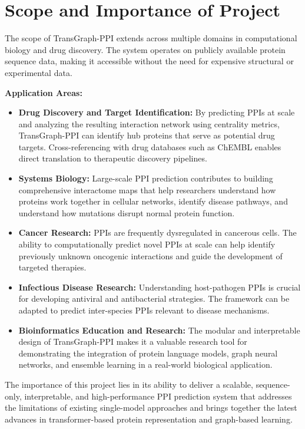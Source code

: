 \documentclass[12pt,a4paper]{report}
\begin{document}
\section{Scope and Importance of Project}
The scope of TransGraph-PPI extends across multiple domains in computational biology and drug discovery. The system operates on publicly available protein sequence data, making it accessible without the need for expensive structural or experimental data.

\par \vspace{8pt} \noindent \textbf{Application Areas:}
\begin{itemize}
    \item \textbf{Drug Discovery and Target Identification:} By predicting PPIs at scale and analyzing the resulting interaction network using centrality metrics, TransGraph-PPI can identify hub proteins that serve as potential drug targets. Cross-referencing with drug databases such as ChEMBL enables direct translation to therapeutic discovery pipelines.
    \item \textbf{Systems Biology:} Large-scale PPI prediction contributes to building comprehensive interactome maps that help researchers understand how proteins work together in cellular networks, identify disease pathways, and understand how mutations disrupt normal protein function.
    \item \textbf{Cancer Research:} PPIs are frequently dysregulated in cancerous cells. The ability to computationally predict novel PPIs at scale can help identify previously unknown oncogenic interactions and guide the development of targeted therapies.
    \item \textbf{Infectious Disease Research:} Understanding host-pathogen PPIs is crucial for developing antiviral and antibacterial strategies. The framework can be adapted to predict inter-species PPIs relevant to disease mechanisms.
    \item \textbf{Bioinformatics Education and Research:} The modular and interpretable design of TransGraph-PPI makes it a valuable research tool for demonstrating the integration of protein language models, graph neural networks, and ensemble learning in a real-world biological application.
\end{itemize}

The importance of this project lies in its ability to deliver a scalable, sequence-only, interpretable, and high-performance PPI prediction system that addresses the limitations of existing single-model approaches and brings together the latest advances in transformer-based protein representation and graph-based learning.
\end{document}
